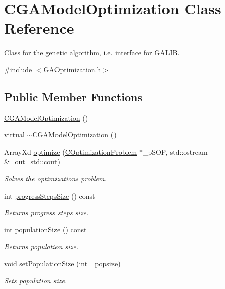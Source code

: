 \hypertarget{class_c_g_a_model_optimization}{\section{C\-G\-A\-Model\-Optimization Class Reference}
\label{class_c_g_a_model_optimization}
}


Class for the genetic algorithm, i.\-e. interface for G\-A\-L\-I\-B.  




{\ttfamily \#include $<$G\-A\-Optimization.\-h$>$}

\subsection*{Public Member Functions}
\begin{DoxyCompactItemize}
\item 
\hyperlink{class_c_g_a_model_optimization_a3e7d2d1af84f747b69521af1b3cb98b1}{C\-G\-A\-Model\-Optimization} ()
\item 
virtual \hyperlink{class_c_g_a_model_optimization_a932712b68c1d4ee55338d8ba034bddca}{$\sim$\-C\-G\-A\-Model\-Optimization} ()
\item 
Array\-Xd \hyperlink{class_c_g_a_model_optimization_a9bb25fd06282c76aae2faa19b16786a7}{optimize} (\hyperlink{class_c_optimization_problem}{C\-Optimization\-Problem} $\ast$\-\_\-p\-S\-O\-P, std\-::ostream \&\-\_\-out=std\-::cout)
\begin{DoxyCompactList}\small\item\em Solves the optimizations problem. \end{DoxyCompactList}\item 
int \hyperlink{class_c_g_a_model_optimization_a8dd868da2dc8b1a1e648e1e1ec34d02f}{progress\-Steps\-Size} () const 
\begin{DoxyCompactList}\small\item\em Returns progress steps size. \end{DoxyCompactList}\item 
int \hyperlink{class_c_g_a_model_optimization_a6afd417c7d16c6e721aa3aa6b84f5b60}{population\-Size} () const 
\begin{DoxyCompactList}\small\item\em Returns population size. \end{DoxyCompactList}\item 
void \hyperlink{class_c_g_a_model_optimization_abb540bb6a17610b32bfea0863a3b4eb6}{set\-Population\-Size} (int \-\_\-popsize)
\begin{DoxyCompactList}\small\item\em Sets population size. \end{DoxyCompactList}\end{DoxyCompactItemize}
